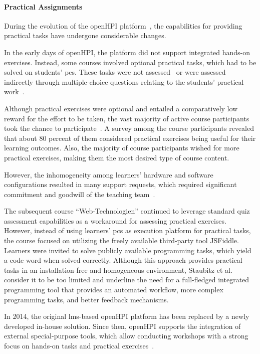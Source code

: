 \paragraph{Practical Assignments}

During the evolution of the openHPI platform~\cite{meinel2013openhpi,meinel80openhpi}, the capabilities for providing practical tasks have undergone considerable changes.

In the early days of openHPI, the platform did not support integrated hands-on exercises. Instead, some courses involved optional practical tasks, which had to be solved on students' \glspl{pc}. These tasks were not assessed~\cite{naumann2014ein} or were assessed indirectly through multiple-choice questions relating to the students' practical work~\cite{willems2013introducing}.

Although practical exercises were optional and entailed a comparatively low reward for the effort to be taken, the vast majority of active course participants took the chance to participate~\cite{staubitz2014lightweight}. A survey among the course participants revealed that about 80 percent of them considered practical exercises being useful for their learning outcomes. Also, the majority of course participants wished for more practical exercises, making them the most desired type of course content.

However, the inhomogeneity among learners' hardware and software configurations resulted in many support requests, which required significant commitment and goodwill of the teaching team~\cite{willems2013introducing}.

The subsequent course ``Web-Technologien'' continued to leverage standard quiz assessment capabilities as a workaround for assessing practical exercises. However, instead of using learners' \glspl{pc} as execution platform for practical tasks, the course focused on utilizing the freely available third-party tool JSFiddle. Learners were invited to solve publicly available programming tasks, which yield a code word when solved correctly. Although this approach provides practical tasks in an installation-free and homogeneous environment, Staubitz et al.~\cite{staubitz2014lightweight} consider it to be too limited and underline the need for a full-fledged integrated programming tool that provides an automated workflow, more complex programming tasks, and better feedback mechanisms.

In 2014, the original \gls{lms}-based openHPI platform has been replaced by a newly developed in-house solution. Since then, openHPI supports the integration of external special-purpose tools, which allow conducting workshops with a strong focus on hands-on tasks and practical exercises~\cite{loewis2014scaling}.
